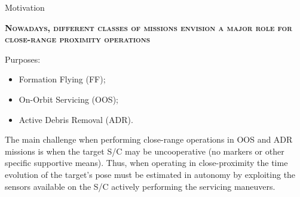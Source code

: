 \documentclass[10pt]{beamer}
\begin{document}
\begin{frame}{Motivation}

  \textsc{\textbf{\large Nowadays, different classes of missions envision a major role for close-range proximity operations}}

  \bigskip

  \begin{minipage}[t]{0.4\textwidth}
    \vspace{0.01mm}
    Purposes:
  \end{minipage}%
  \begin{minipage}[t]{0.6\textwidth}
    \vspace{0.01mm}
    \begin{itemize}[label=$\bullet$]
      \item Formation Flying (FF);
      \item On-Orbit Servicing (OOS);
      \item Active Debris Removal (ADR).
    \end{itemize}
  \end{minipage}

  \bigskip

The main challenge when performing close-range operations in OOS and ADR missions is when the target S/C may be \alert{uncooperative} (no markers or other specific supportive means). Thus, when operating in close-proximity the time evolution of the target's \alert{pose} must be estimated in autonomy by exploiting the sensors available on the S/C actively performing the servicing maneuvers.

\end{frame}
\end{document}
